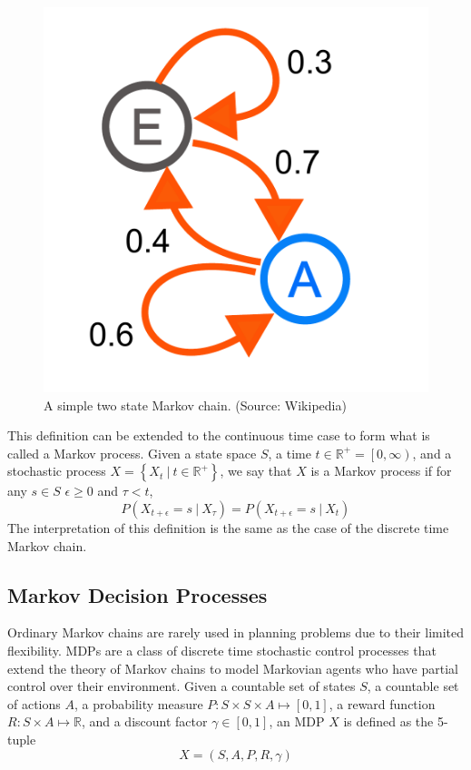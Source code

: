 \documentclass[tog]{acmsiggraph}
\newcommand{\given}[1][]{\:#1\vert\:}
\begin{document}
\begin{figure}[h]
  \centering
  \def\svgwidth{\columnwidth}
  \includegraphics[scale=0.3]{MarkovChain.pdf}
  \caption{A simple two state Markov chain. (Source: Wikipedia)}
  \label{fig:markovChain}
\end{figure}

This definition can be extended to the continuous time case to form 
what is called a Markov process. Given a state space $S$, a time 
$t \in \mathbb{R}^+ = \left[ 0, \infty \right)$, and a stochastic process 
$X = \left\{ X_t \given t \in \mathbb{R}^+ \right\}$, we say that $X$ is a 
Markov process if for any $s \in S$ $\epsilon \geq 0$ and $\tau < t$,
\begin{equation*}
  P \left( X_{t+\epsilon} = s \given X_\tau \right) = P \left( X_{t+\epsilon} = s \given X_t \right)
\end{equation*}
The interpretation of this definition is the same as the case of the discrete time Markov chain.

\subsection{Markov Decision Processes}

Ordinary Markov chains are rarely used in planning problems due to their 
limited flexibility. MDPs are a class of discrete time stochastic control 
processes that extend the theory of Markov chains to model Markovian agents 
who have partial control over their environment. Given a countable set of 
states $S$, a countable set of actions $A$, a probability measure 
$P : S \times S \times A \mapsto \left[0, 1 \right]$, a reward function 
$R : S \times A \mapsto \mathbb{R}$, and a discount factor $\gamma \in \left[0, 1 \right]$,
an MDP $X$ is defined as the 5-tuple
\begin{equation*}
  X = \left(S, A, P, R, \gamma \right)
\end{equation*}
\end{document}
